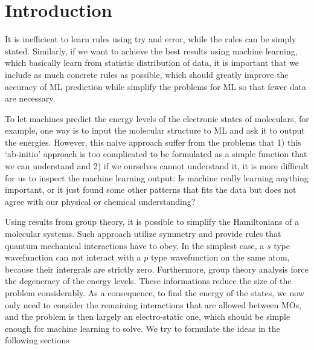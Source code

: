 \documentclass{article}
\begin{document}
\section{Introduction}

It is inefficient to learn rules using try and error, while the rules can be 
simply stated. 
Similarly, if we want to achieve the best results using machine learning, which 
basically learn from statistic distribution of data, 
it is important that we include as much concrete rules as possible,
which should greatly improve the accuracy of ML prediction while simplify the 
problems for ML so that fewer data are necessary.

To let machines predict the energy levels of the electronic states of moleculars, for example,
one way is to input the molecular structure to ML and ask it to output the energies. 
However, this naive approach suffer from the problems that 1) this `ab-initio' approach
is too complicated to be formulated as a simple function that we can understand 
and 2) if we ourselves cannot understand it, it is more difficult for us to inspect the 
machine learning output: Is machine really learning anything important, or it just 
found some other patterns that fits the data but does not agree with our physical 
or chemical understanding?

Using results from group theory, it is possible to simplify the Hamiltonians of 
a molecular systems. Such approach utilize symmetry and provide
rules that quantum mechanical interactions have to obey. 
In the simplest case, a $s$ type wavefunction can not interact with a $p$ type wavefunction on the 
same atom, because their intergrals are strictly zero. 
Furthermore, group theory analysis force the degeneracy of the energy levels.
These informations reduce the size of the problem considerably. As a consequence, to 
find the energy of the states, we now only need to consider the remaining interactions 
that are allowed between MOs, and the problem is then largely 
an electro-static one, which should be simple enough for machine learning to solve.
We try to formulate the ideas in the following sections
\end{document}
